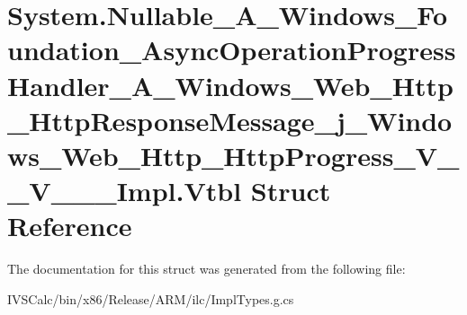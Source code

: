 \hypertarget{struct_system_1_1_nullable___a___windows___foundation___async_operation_progress_handler___a___wb40b769603dd9f551c3599f6abefba03}{}\section{System.\+Nullable\+\_\+\+A\+\_\+\+Windows\+\_\+\+Foundation\+\_\+\+Async\+Operation\+Progress\+Handler\+\_\+\+A\+\_\+\+Windows\+\_\+\+Web\+\_\+\+Http\+\_\+\+Http\+Response\+Message\+\_\+j\+\_\+\+Windows\+\_\+\+Web\+\_\+\+Http\+\_\+\+Http\+Progress\+\_\+\+V\+\_\+\+\_\+\+V\+\_\+\+\_\+\+\_\+\+Impl.\+Vtbl Struct Reference}
\label{struct_system_1_1_nullable___a___windows___foundation___async_operation_progress_handler___a___wb40b769603dd9f551c3599f6abefba03}


The documentation for this struct was generated from the following file\+:\begin{DoxyCompactItemize}
\item 
I\+V\+S\+Calc/bin/x86/\+Release/\+A\+R\+M/ilc/Impl\+Types.\+g.\+cs\end{DoxyCompactItemize}
